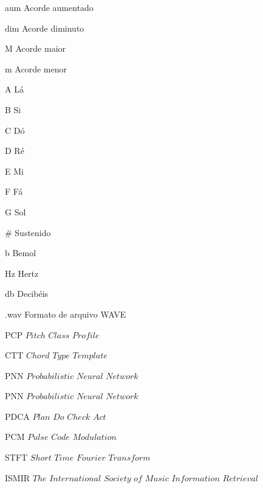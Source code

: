 \begin{siglas}
  \item[aum] Acorde aumentado
  \item[dim] Acorde diminuto
  \item[M] Acorde maior
  \item[m] Acorde menor
  \item[A] Lá
  \item[B] Si
  \item[C] Dó
  \item[D] Ré
  \item[E] Mi
  \item[F] Fá
  \item[G] Sol
  \item[\#] Sustenido
  \item[b] Bemol
  \item[Hz] Hertz
  \item[db] Decibéis
  \item[.wav] Formato de arquivo WAVE
  \item[PCP] $Pitch$ $Class$ $Profile$
  \item[CTT] $Chord$ $Type$ $Template$
  \item[PNN] $Probabilistic$ $Neural$ $Network$
  \item[PNN] $Probabilistic$ $Neural$ $Network$
  \item[PDCA] $Plan$ $Do$ $Check$ $Act$
  \item[PCM] $Pulse$ $Code$ $Modulation$
  \item[STFT] $Short$ $Time$ $Fourier$ $Transform$
  \item[ISMIR] $The$ $International$ $Society$ $of$ $Music$ $Information$ $Retrieval$
  
\end{siglas}
